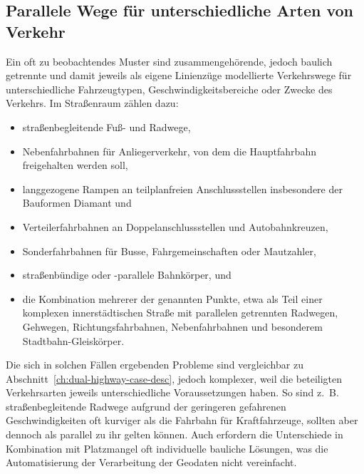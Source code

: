 \documentclass[../main/thesis.tex]{subfiles}
\begin{document}


\subsection{Parallele Wege für unterschiedliche Arten von Verkehr}

Ein oft zu beobachtendes Muster sind zusammengehörende, jedoch baulich getrennte und damit jeweils als eigene Linienzüge modellierte Verkehrswege für unterschiedliche Fahrzeugtypen, Geschwindigkeitsbereiche oder Zwecke des Verkehrs.
Im Straßenraum zählen dazu:

\begin{itemize}
	\item straßenbegleitende Fuß- und Radwege,
	\item Nebenfahrbahnen  für Anliegerverkehr, von dem die Hauptfahrbahn freigehalten werden soll,
	\item langgezogene Rampen an teilplanfreien Anschlussstellen insbesondere der Bauformen Diamant und 
	\item Verteilerfahrbahnen an Doppelanschlussstellen und Autobahnkreuzen,
	\item Sonderfahrbahnen für Busse, Fahrgemeinschaften oder Mautzahler,
	\item straßenbündige oder -parallele Bahnkörper, und
	\item die Kombination mehrerer der genannten Punkte, etwa als Teil einer komplexen innerstädtischen Straße mit parallelen getrennten Radwegen, Gehwegen, Richtungsfahrbahnen, Nebenfahrbahnen und besonderem Stadtbahn-Gleiskörper.
\end{itemize}

Die sich in solchen Fällen ergebenden Probleme sind vergleichbar zu Abschnitt~\ref{ch:dual-highway-case-desc}, jedoch komplexer, weil die beteiligten Verkehrsarten jeweils unterschiedliche Voraussetzungen haben.
So sind z.~B. straßenbegleitende Radwege aufgrund der geringeren gefahrenen Geschwindigkeiten oft kurviger als die Fahrbahn für Kraftfahrzeuge, sollten aber dennoch als parallel zu ihr gelten können.
Auch erfordern die Unterschiede in Kombination mit Platzmangel oft individuelle bauliche Lösungen, was die Automatisierung der Verarbeitung der Geodaten nicht vereinfacht.
\end{document}
